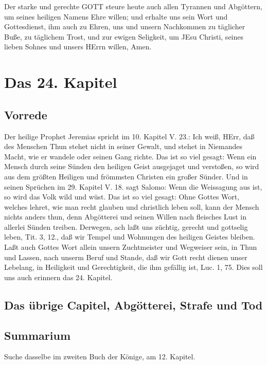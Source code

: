 Der starke und gerechte GOTT steure heute auch allen Tyrannen und Abgöttern, um seines heiligen Namens Ehre willen; und erhalte uns sein Wort und Gottesdienst, ihm auch zu Ehren, uns und unsern Nachkommen zu täglicher Buße, zu täglichem Trost, und zur ewigen Seligkeit, um JEsu Christi, seines lieben Sohnes und unsers HErrn willen, Amen.

\chapter{Das 24. Kapitel}

\section{Vorrede}

Der heilige Prophet Jeremias spricht im 10. Kapitel V. 23.: Ich weiß, HErr, daß des Menschen Thun stehet nicht in seiner Gewalt, und stehet in Niemandes Macht, wie er wandele oder seinen Gang richte. Das ist so viel gesagt: Wenn ein Mensch durch seine Sünden den heiligen Geist ausgejaget und verstoßen, so wird aus dem größten Heiligen und frömmsten Christen ein großer Sünder. Und in seinen Sprüchen im 29. Kapitel V. 18. sagt Salomo: Wenn die Weissagung aus ist, so wird das Volk wild und wüst. Das ist so viel gesagt: Ohne Gottes Wort, welches lehret, wie man recht glauben und christlich leben soll, kann der Mensch nichts anders thun, denn Abgötterei und seinen Willen nach fleisches Lust in allerlei Sünden treiben. Derwegen, ach laßt uns züchtig, gerecht und gottselig leben, Tit. 3, 12., daß wir Tempel und Wohnungen des heiligen Geistes bleiben. Laßt auch Gottes Wort allein unsern Zuchtmeister und Wegweiser sein, in Thun und Lassen, nach unserm Beruf und Stande, daß wir Gott recht dienen unser Lebelang, in Heiligkeit und Gerechtigkeit, die ihm gefällig ist, Luc. 1, 75. Dies soll uns auch erinnern das 24. Kapitel.

\section[Das übrige Capitel, Abgötterei, Strafe und Tod]{Das übrige Capitel, Abgötterei, Strafe und Tod}

\section{Summarium}

Suche dasselbe im zweiten Buch der Könige, am 12. Kapitel.

